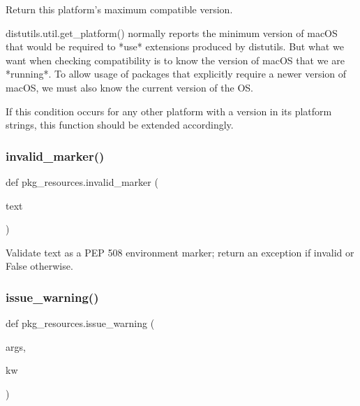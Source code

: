 \begin{DoxyVerb}Return this platform's maximum compatible version.

distutils.util.get_platform() normally reports the minimum version
of macOS that would be required to *use* extensions produced by
distutils.  But what we want when checking compatibility is to know the
version of macOS that we are *running*.  To allow usage of packages that
explicitly require a newer version of macOS, we must also know the
current version of the OS.

If this condition occurs for any other platform with a version in its
platform strings, this function should be extended accordingly.
\end{DoxyVerb}
 \mbox{\label{namespacepkg__resources_aeb46162da9479c499b4bac06b6ed557a}} 
\subsubsection{\texorpdfstring{invalid\+\_\+marker()}{invalid\_marker()}}
{\footnotesize\ttfamily def pkg\+\_\+resources.\+invalid\+\_\+marker (\begin{DoxyParamCaption}\item[{}]{text }\end{DoxyParamCaption})}

\begin{DoxyVerb}Validate text as a PEP 508 environment marker; return an exception
if invalid or False otherwise.
\end{DoxyVerb}
 \mbox{\label{namespacepkg__resources_a0d5beebf84841e70b7b06058e4fb4cc2}} 
\subsubsection{\texorpdfstring{issue\+\_\+warning()}{issue\_warning()}}
{\footnotesize\ttfamily def pkg\+\_\+resources.\+issue\+\_\+warning (\begin{DoxyParamCaption}\item[{}]{args,  }\item[{}]{kw }\end{DoxyParamCaption})}

